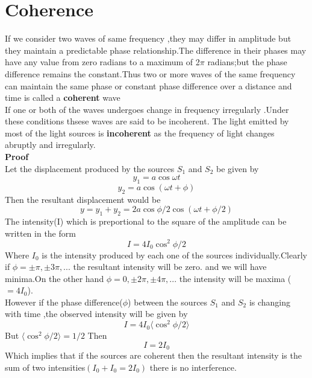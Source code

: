 \section{Coherence}
If we consider two waves of same frequency ,they may differ in amplitude but they maintain a predictable phase relationship.The difference in their phases may have any value from zero radians to a maximum of 2$\pi$ radians;but the phase difference remains the constant.Thus two or more waves of the same frequency can maintain the same phase or constant phase difference over a distance and time  is called a \textbf{coherent} wave\\
If one or both of the waves undergoes change in frequency irregularly .Under these conditions thsese waves are said to be incoherent. The light emitted by most of the light sources is \textbf{incoherent} as the frequency of light changes abruptly and irregularly.\\
\textbf{Proof}\\
Let the displacement produced by the sources $S_1$ and $S_2$ be given by \\
$$y_1=a\cos \omega t$$
$$y_2=a\cos (\omega t+\phi)$$
Then the resultant displacement would be 
$$y=y_1+y_2=2a\cos \phi/2\cos (\omega t+\phi/2)$$
The intensity(I)  which is preportional to the square of the amplitude can be written in the form\\
$$I=4I_0\cos^2 \phi/2$$
Where $I_0$ is the intensity produced by each one of the sources individually.Clearly if $\phi=\pm \pi ,\pm 3\pi,...$ the resultant intensity will be zero. and we will have minima.On the other hand $\phi=0,\pm2\pi,\pm 4\pi,...$ the intensity will be maxima ($=4I_0$).\\
However if the phase difference($\phi$) between the sources $S_1$ and $S_2$ is changing with time ,the observed intensity will be given by 
$$I=4I_0\langle \cos^2\phi/2\rangle$$
But $\langle\cos^2\phi/2\rangle=1/2$
Then \\
$$I=2I_0$$
Which implies that if the sources are coherent then the resultant intensity is the sum of two intensities$(I_0+I_0=2I_0)$ there is no interference.\\
